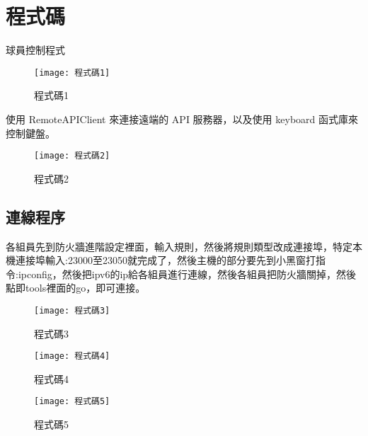 \chapter{程式碼}
 球員控制程式\\
 
 \begin{figure}[hbt!]
\begin{center}
\texttt{[image: 程式碼1]}
\caption{\Large 程式碼1}\label{fig.程式碼1}
\end{center}
\end{figure}

 使用 RemoteAPIClient 來連接遠端的 API 服務器，以及使用
keyboard 函式庫來控制鍵盤。\\
\begin{figure}[hbt!]
\begin{center}
\texttt{[image: 程式碼2]}
\caption{\Large 程式碼2}\label{fig.程式碼2}
\end{center}
\end{figure}
\newpage
 
\section{連線程序}
各組員先到防火牆進階設定裡面，輸入規則，然後將規則類型改成連接埠，特定本機連接埠輸入:23000至23050就完成了，然後主機的部分要先到小黑窗打指令:ipconfig，然後把ipv6的ip給各組員進行連線，然後各組員把防火牆關掉，然後點即tools裡面的go，即可連接。\\
\begin{figure}[hbt!]
\begin{center}
\texttt{[image: 程式碼3]}
\caption{\Large 程式碼3}\label{fig.程式碼3}
\end{center}
\end{figure}
\newpage

\begin{figure}[hbt!]
\begin{center}
\texttt{[image: 程式碼4]}
\caption{\Large 程式碼4}\label{fig.程式碼4}
\end{center}
\end{figure}

\begin{figure}[hbt!]
\begin{center}
\texttt{[image: 程式碼5]}
\caption{\Large 程式碼5}\label{fig.程式碼5}
\end{center}
\end{figure}
\newpage